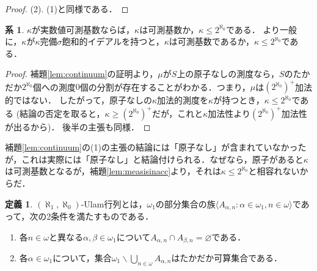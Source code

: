 \documentclass[uplatex]{jsarticle}
\newcommand{\seq}[1]{{\langle#1\rangle}}
\renewcommand\emptyset{\varnothing}
\renewcommand{\setminus}{\smallsetminus}
\theoremstyle{definition}
\newtheorem{defi}[thm]{定義}
\newtheorem{cor}[thm]{系}
\begin{document}
\begin{proof}
		
		
		
		(2). (1)と同様である．
	\end{proof}
	
	\begin{cor}
		$\kappa$が実数値可測基数ならば，$\kappa$は可測基数か，$\kappa \le 2^{\aleph_0}$である．
		より一般に，$\kappa$が$\kappa$完備$\sigma$飽和的イデアルを持つと，$\kappa$は可測基数であるか，$\kappa \le 2^{\aleph_0}$である．
	\end{cor}
	\begin{proof}
		補題\ref{lem:continuum}の証明より，$\mu$が$S$上の原子なしの測度なら，$S$のたかだか$2^{\aleph_0}$個への測度$0$個の分割が存在することがわかる．つまり，$\mu$は$(2^{\aleph_0})^+$加法的ではない．
		したがって，原子なしの$\kappa$加法的測度を$\kappa$が持つとき，$\kappa \le 2^{\aleph_0}$である (結論の否定を取ると，$\kappa \ge (2^{\aleph_0})^+$だが，これと$\kappa$加法性より$(2^{\aleph_0})^+$加法性が出るから)．
		後半の主張も同様．
	\end{proof}
	
	補題\ref{lem:continuum}の(1)の主張の結論には「原子なし」が含まれていなかったが，これは実際には「原子なし」と結論付けられる．なぜなら，原子があると$\kappa$は可測基数となるが，補題\ref{lem:measisinacc}より，それは$\kappa \le 2^{\aleph_0}$と相容れないからだ．
	
	\begin{defi}
		$(\aleph_1, \aleph_0)$-Ulam行列とは，$\omega_1$の部分集合の族$\seq{ A_{\alpha, n} : \alpha \in \omega_1, n \in \omega }$であって，次の2条件を満たすものである．
		\begin{enumerate}
			\item 各$n \in \omega$と異なる$\alpha, \beta \in \omega_1$について$A_{\alpha,n} \cap A_{\beta,n} = \emptyset$である．
			\item 各$\alpha \in \omega_1$について，集合$\omega_1 \setminus \bigcup_{n \in \omega} A_{\alpha,n}$はたかだか可算集合である．
		\end{enumerate}
	\end{defi}
	
\end{document}
